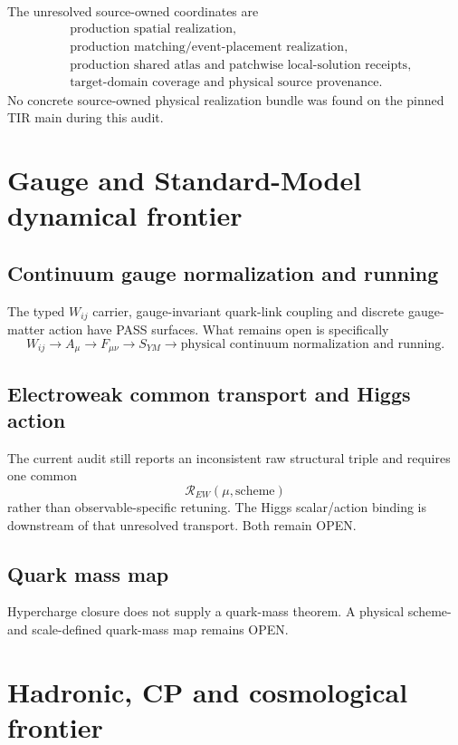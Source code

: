 The unresolved source-owned coordinates are
\[
\boxed{
\begin{aligned}
&\text{production spatial realization},\\
&\text{production matching/event-placement realization},\\
&\text{production shared atlas and patchwise local-solution receipts},\\
&\text{target-domain coverage and physical source provenance}.
\end{aligned}}
\]
No concrete source-owned physical realization bundle was found on the pinned
TIR main during this audit.

\section{Gauge and Standard-Model dynamical frontier}

\subsection{Continuum gauge normalization and running}

The typed \(W_{ij}\) carrier, gauge-invariant quark-link coupling and discrete
gauge-matter action have PASS surfaces. What remains open is specifically
\[
\boxed{
W_{ij}\to A_\mu\to F_{\mu\nu}\to S_{YM}
\to\text{physical continuum normalization and running}.
}
\]

\subsection{Electroweak common transport and Higgs action}

The current audit still reports an inconsistent raw structural triple and
requires one common
\[
\boxed{\mathcal R_{EW}(\mu,\mathrm{scheme})}
\]
rather than observable-specific retuning. The Higgs scalar/action binding is
downstream of that unresolved transport. Both remain OPEN.

\subsection{Quark mass map}

Hypercharge closure does not supply a quark-mass theorem. A physical
scheme- and scale-defined quark-mass map remains OPEN.

\section{Hadronic, CP and cosmological frontier}

